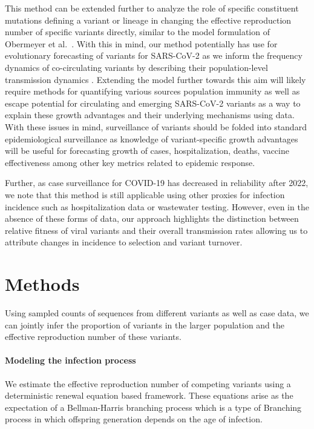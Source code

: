\documentclass[11pt,oneside,letterpaper]{article}
\begin{document}
This method can be extended further to analyze the role of specific constituent mutations defining a variant or lineage in changing the effective reproduction number of specific variants directly, similar to the model formulation of Obermeyer et al.\ \cite{Obermeyer2021}.
With this in mind, our method potentially has use for evolutionary forecasting of variants for SARS-CoV-2 as we inform the frequency dynamics of co-circulating variants by describing their population-level transmission dynamics \cite{abousamra2024fitness}.
Extending the model further towards this aim will likely require methods for quantifying various sources population immunity as well as escape potential for circulating and emerging SARS-CoV-2 variants as a way to explain these growth advantages and their underlying mechanisms using data.
With these issues in mind, surveillance of variants should be folded into standard epidemiological surveillance as knowledge of variant-specific growth advantages will be useful for forecasting growth of cases, hospitalization, deaths, vaccine effectiveness among other key metrics related to epidemic response.

Further, as case surveillance for COVID-19 has decreased in reliability after 2022, we note that this method is still applicable using other proxies for infection incidence such as hospitalization data or wastewater testing.
However, even in the absence of these forms of data, our approach highlights the distinction between relative fitness of viral variants and their overall transmission rates allowing us to attribute changes in incidence to selection and variant turnover.

\section*{Methods}

Using sampled counts of sequences from different variants as well as case data, we can jointly infer the proportion of variants in the larger population and the effective reproduction number of these variants.

\paragraph{Modeling the infection process}%

We estimate the effective reproduction number of competing variants using a deterministic renewal equation based framework. These equations arise as the expectation of a Bellman-Harris branching process \cite{Bellman1948} which is a type of Branching process in which offspring generation depends on the age of infection.
\end{document}
